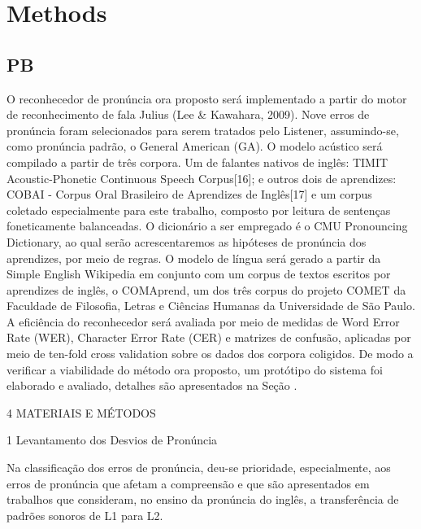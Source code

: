 
\chapter{Methods}\label{ch:methods}

\section{PB}

O reconhecedor de pron\'uncia ora proposto ser\'a implementado a partir do
motor de reconhecimento de fala Julius (Lee \& Kawahara, 2009). Nove
erros de pron\'uncia foram selecionados para serem tratados pelo Listener,
assumindo-se, como pron\'uncia padr\~ao, o General American (GA). O modelo
ac\'ustico ser\'a compilado a partir de tr\^es corpora. Um de falantes nativos
de ingl\^es: TIMIT Acoustic-Phonetic Continuous Speech Corpus{[}16{]}; e
outros dois de aprendizes: COBAI - Corpus Oral Brasileiro de Aprendizes
de Ingl\^es{[}17{]} e um corpus coletado especialmente para este trabalho,
composto por leitura de senten\c{c}as foneticamente balanceadas. O
dicion\'ario a ser empregado \'e o CMU Pronouncing Dictionary, ao qual ser\~ao
acrescentaremos as hip\'oteses de pron\'uncia dos aprendizes, por meio de
regras. O modelo de l\'ingua ser\'a gerado a partir da Simple English
Wikipedia em conjunto com um corpus de textos escritos por aprendizes de
ingl\^es, o COMAprend, um dos tr\^es corpus do projeto COMET da Faculdade de
Filosofia, Letras e Ci\^encias Humanas da Universidade de S\~ao Paulo. A
efici\^encia do reconhecedor ser\'a avaliada por meio de medidas de Word
Error Rate (WER), Character Error Rate (CER) e matrizes de confus\~ao,
aplicadas por meio de ten-fold cross validation sobre os dados dos
corpora coligidos. De modo a verificar a viabilidade do m\'etodo ora
proposto, um prot\'otipo do sistema foi elaborado e avaliado, detalhes s\~ao
apresentados na Se\c{c}\~ao .

4 MATERIAIS E M\'ETODOS

1 Levantamento dos Desvios de Pron\'uncia

Na classifica\c{c}\~ao dos erros de pron\'uncia, deu-se prioridade,
especialmente, aos erros de pron\'uncia que afetam a compreens\~ao e que s\~ao
apresentados em trabalhos que consideram, no ensino da pron\'uncia do
ingl\^es, a transfer\^encia de padr\~oes sonoros de L1 para L2.


